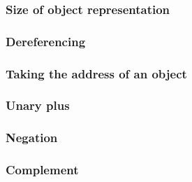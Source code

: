 \documentclass[a4paper,12pt]{article}
\begin{document}
\subsubsection{Size of object representation}


\subsubsection{Dereferencing}

\subsubsection{Taking the address of an object}

\subsubsection{Unary plus}

\subsubsection{Negation}


\subsubsection{Complement}
\end{document}
